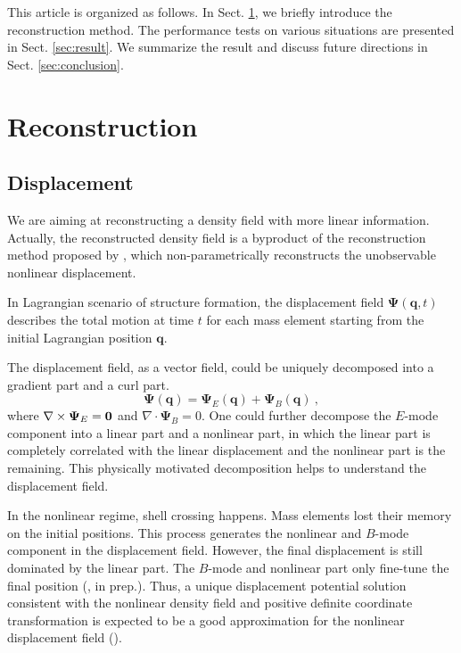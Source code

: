 \documentclass[iop]{emulateapj}
\newcommand{\be}{\begin{equation}}
\newcommand{\ee}{\end{equation}}
\newcommand{\vecq}{{\bm{q}}}
\newcommand{\vecPsi}{{\bm{\Psi}}}
\begin{document}
{This article is organized as follows.
In Sect. \ref{sec:recon}, we briefly introduce the reconstruction method.
The performance tests on various situations are presented in Sect. \ref{sec:result}.
We summarize the result and discuss future directions in Sect. \ref{sec:conclusion}.


\section{Reconstruction}
\label{sec:recon}

\subsection{Displacement}
\label{sec:ebdecom}

We are aiming at reconstructing a density field with more linear information.
Actually, the reconstructed density field is a byproduct of the reconstruction method proposed by \cite{zhuhm16c}, which non-parametrically reconstructs the unobservable nonlinear displacement.

In Lagrangian scenario of structure formation, the displacement field $\vecPsi(\vecq,t)$ describes the total motion at time $t$ for each mass element starting from the initial Lagrangian position $\vecq$.

The displacement field, as a vector field, could be uniquely decomposed into a gradient part and a curl part.
\be
\vecPsi(\vecq)=\vecPsi_E(\vecq)+\vecPsi_B(\vecq)\ ,
\ee
where $\nabla\times\vecPsi_E=\bold{0}$ and $\nabla\cdot\vecPsi_B=0$.
One could further decompose the $E$-mode component into a linear part and a nonlinear part,
in which the linear part is completely correlated with the linear displacement and the nonlinear part is the remaining.  This physically motivated decomposition helps to understand the displacement field.

In the nonlinear regime, shell crossing happens.
Mass elements lost their memory on the initial positions.
This process generates the nonlinear and $B$-mode component in the displacement field.
However, the final displacement is still dominated by the linear part.
The $B$-mode and nonlinear part only fine-tune the final position (\cite{zhuhmprep}, in prep.).
Thus, a unique displacement potential solution consistent with the nonlinear density field and positive definite coordinate transformation is expected to be a good approximation for the nonlinear displacement field (\cite{zhuhm16c}).

}
\end{document}
